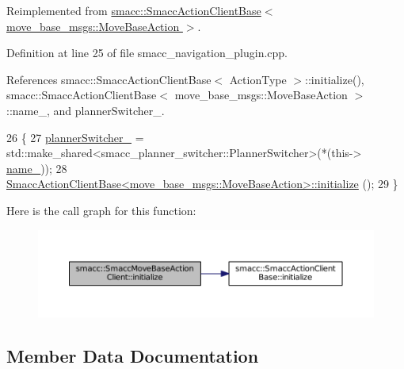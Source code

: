 Reimplemented from \hyperlink{classsmacc_1_1SmaccActionClientBase_a0224d7482b50a706f99bd280495ef1af}{smacc\+::\+Smacc\+Action\+Client\+Base$<$ move\+\_\+base\+\_\+msgs\+::\+Move\+Base\+Action $>$}.



Definition at line 25 of file smacc\+\_\+navigation\+\_\+plugin.\+cpp.



References smacc\+::\+Smacc\+Action\+Client\+Base$<$ Action\+Type $>$\+::initialize(), smacc\+::\+Smacc\+Action\+Client\+Base$<$ move\+\_\+base\+\_\+msgs\+::\+Move\+Base\+Action $>$\+::name\+\_\+, and planner\+Switcher\+\_\+.


\begin{DoxyCode}
26 \{
27     \hyperlink{classsmacc_1_1SmaccMoveBaseActionClient_ae24164268108abf0b35cf51bfba5ec67}{plannerSwitcher\_} = std::make\_shared<smacc\_planner\_switcher::PlannerSwitcher>(*(this->
      \hyperlink{classsmacc_1_1SmaccActionClientBase_a8464e3ec514e57333339fc538a2203f4}{name\_}));
28     \hyperlink{classsmacc_1_1SmaccActionClientBase_a0224d7482b50a706f99bd280495ef1af}{SmaccActionClientBase<move\_base\_msgs::MoveBaseAction>::initialize}
      ();
29 \}
\end{DoxyCode}


Here is the call graph for this function\+:
\nopagebreak
\begin{figure}[H]
\begin{center}
\leavevmode
\includegraphics[width=350pt]{classsmacc_1_1SmaccMoveBaseActionClient_ae520045638a5f722ad1367f6d705b7c4_cgraph}
\end{center}
\end{figure}




\subsection{Member Data Documentation}
